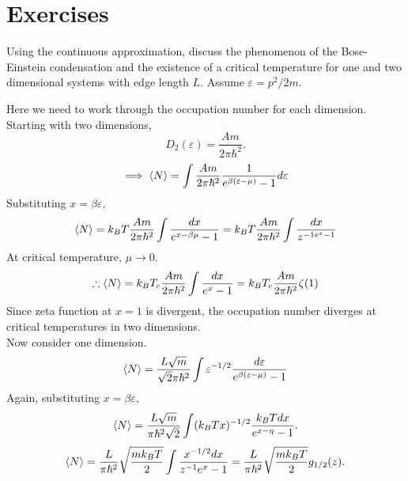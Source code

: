     \section{Exercises}
        \begin{eocproblem*}{}
            Using the continuous approximation, discuss the phenomenon of the Bose-Einstein condensation and the existence of a critical temperature for one and two dimensional systems with edge length $L$. Assume $\varepsilon=p^2/2m$.
        \end{eocproblem*}
            Here we need to work through the occupation number for each dimension. Starting with two dimensions, 
            \begin{equation}
                D_2(\varepsilon) = \frac{A m}{2\pi\hbar^2}.
            \end{equation}
            \begin{equation}
                \implies \langle N \rangle = \int \frac{A m}{2\pi\hbar^2}\frac{1}{e^{\beta(\varepsilon-\mu)}-1}d\varepsilon
            \end{equation}
            Substituting $x=\beta\varepsilon$,
            \begin{equation}
                \langle N \rangle = k_BT\frac{A m}{2\pi\hbar^2}\int \frac{dx}{e^{x-\beta\mu}-1} = k_BT\frac{Am}{2\pi\hbar^2}\int\frac{dx}{z^{-1e^x-1}}
            \end{equation}
            At critical temperature, $\mu\to0$.
            \begin{equation}
                \therefore \langle N \rangle = k_BT_c\frac{Am}{2\pi\hbar^2}\int\frac{dx}{e^x-1} = k_BT_c\frac{Am}{2\pi\hbar^2}\zeta(1)
            \end{equation}
            Since zeta function at $x=1$ is divergent, the occupation number diverges at critical temperatures in two dimensions.\\
            Now consider one dimension. 
            \begin{equation}
                \langle N \rangle = \frac{L\sqrt{m}}{\sqrt{2}\pi\hbar^2}\int\varepsilon^{-1/2}\frac{d\varepsilon}{e^{\beta(\varepsilon-\mu)}-1}
            \end{equation}
            Again, substituting $x=\beta\varepsilon$,
            \begin{equation}
                \langle N \rangle = \frac{L\sqrt{m}}{\pi\hbar^2\sqrt{2}}\int(k_BTx)^{-1/2}\frac{k_BT dx}{e^{x-\eta}-1}.
            \end{equation} 
            \begin{equation}
                \langle N \rangle = \frac{L}{\pi\hbar^2}\sqrt{\frac{mk_BT}{2}}\int\frac{x^{-1/2}dx}{z^{-1}e^x-1} = \frac{L}{\pi\hbar^2}\sqrt{\frac{mk_BT}{2}}g_{1/2}(z).
            \end{equation}
